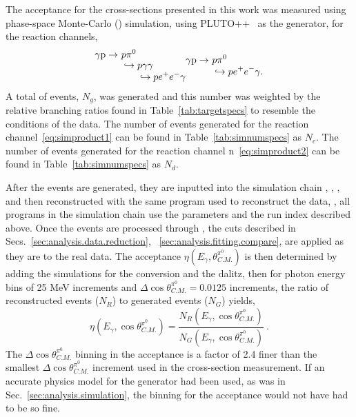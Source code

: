 	 The acceptance for the cross-sections presented in this work was measured using phase-space Monte-Carlo (\label{abbr:mc}) simulation, using PLUTO++~\cite{PLUTO} as the generator, for the reaction channels,
	\begin{subequations}
		\begin{align}
				\gamma \p \rightarrow & \ p \pi^{0} \nonumber \\[-0.4em]
				& \ \hookrightarrow p \gamma \gamma \nonumber \\[-0.4em]
				& \qquad \hookrightarrow p e^+ e^- \gamma
				\label{eq:simproduct1}
			\end{align}
			\begin{align}
				\gamma \p \rightarrow & \ p \pi^{0} \nonumber \\[-0.4em]
				& \ \hookrightarrow p e^+ e^- \gamma.
				\label{eq:simproduct2}
			\end{align}
		\end{subequations} 
		A total of events, $N_g$, was generated and this number was weighted by the relative branching ratios found in Table~\ref{tab:targetspecs} to resemble the conditions of the data. The number of events generated for the reaction channel~\ref{eq:simproduct1} can be found in Table~\ref{tab:simnumspecs} as $N_c$. The number of events generated for the reaction channel n~\ref{eq:simproduct2} can be found in Table~\ref{tab:simnumspecs} as $N_d$.
		
		After the events are generated, they are inputted into the  simulation chain \label{abbr:gamp2bos}, \label{abbr:gsim}, \label{abbr:gpp}, and then reconstructed with the same program used to reconstruct the data, \label{abbr:a1c}, all programs in the simulation chain use the parameters and the run index described above. Once the events are processed through , the cuts described in Secs.~\ref{sec:analysis.data.reduction}, ~\ref{sec:analysis.fitting.compare}, are applied as they are to the real data. The acceptance $\eta(E_\gamma,\theta^{\pi^0}_{C.M.})$ is then determined by adding the simulations for the conversion and the dalitz, then for photon energy bins of 25 MeV increments and $\Delta\cos\theta^{\pi^0}_{C.M.} = 0.0125$ increments, the ratio of reconstructed events ($N_R$) to generated events ($N_G$) yields,
		\begin{equation}\label{eq:acceptance}
		\eta(E_\gamma,\cos\theta^{\pi^0}_{C.M.}) = \frac{N_R(E_\gamma,\cos\theta^{\pi^0}_{C.M.})}{N_G(E_\gamma,\cos\theta^{\pi^0}_{C.M.})} \ .
		\end{equation}
		The $\Delta\cos\theta^{\pi^0}_{C.M.}$ binning in the acceptance is a factor of 2.4 finer than the smallest $\Delta\cos\theta^{\pi^0}_{C.M.}$ increment used in the cross-section measurement. If an accurate physics model for the generator had been used, as was in Sec.~\ref{sec:analysis.simulation}, the binning for the acceptance  would not have had to be so fine.
	
